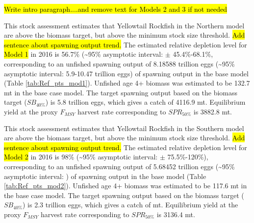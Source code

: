 \documentclass[12pt,]{article}
\begin{document}
\hl{Write intro paragraph....and remove text for Models 2 and 3 if not needed}

This stock assessment estimates that Yellowtail Rockfish in the Northern
model are above the biomass target, but above the minimum stock size
threshold. \hl{Add sentence about spawning output trend.} The estimated
relative depletion level for \hl{Model 1} in 2016 is 56.7\%
(\textasciitilde{}95\% asymptotic interval: \(\pm\) 45.4\%-68.1\%,
corresponding to an unfished spawning output of 8.18588 trillion eggs
(\textasciitilde{}95\% asymptotic interval: 5.9-10.47 trillion eggs) of
spawning output in the base model (Table \ref{tab:Ref_pts_mod1}).
Unfished age 4+ biomass was estimated to be 132.7 mt in the base case
model. The target spawning output based on the biomass target
(\(SB_{40\%}\)) is 5.8 trillion eggs, which gives a catch of 4116.9 mt.
Equilibrium yield at the proxy \(F_{MSY}\) harvest rate corresponding to
\(SPR_{50\%}\) is 3882.8 mt.

This stock assessment estimates that Yellowtail Rockfish in the Southern
model are above the biomass target, but above the minimum stock size
threshold. \hl{Add sentence about spawning output trend.} The estimated
relative depletion level for \hl{Model 2} in 2016 is 98\%
(\textasciitilde{}95\% asymptotic interval: \(\pm\) 75.5\%-120\%),
corresponding to an unfished spawning output of 5.68452 trillion eggs
(\textasciitilde{}95\% asymptotic interval: ) of spawning output in the
base model (Table \ref{tab:Ref_pts_mod2}). Unfished age 4+ biomass was
estimated to be 117.6 mt in the base case model. The target spawning
output based on the biomass target (\(SB_{40\%}\)) is 2.3 trillion eggs,
which gives a catch of mt. Equilibrium yield at the proxy \(F_{MSY}\)
harvest rate corresponding to \(SPR_{50\%}\) is 3136.4 mt.

\FloatBarrier
\end{document}
